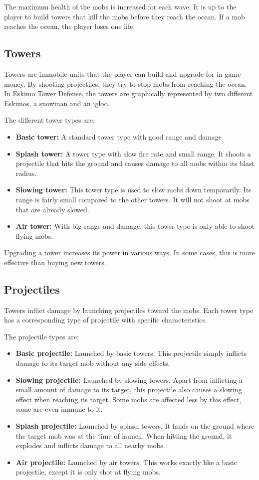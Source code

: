 The maximum health of the mobs is increased for each wave. It is up to the player to build towers that kill the mobs before they reach the ocean. If a mob reaches the ocean, the player loses one life.

\subsection{Towers}

Towers are immobile units that the player can build and upgrade for in-game money. By shooting projectiles, they try to stop mobs from reaching the ocean. In Eskimo Tower Defense, the towers are graphically represented by two different Eskimos, a snowman and an igloo. 

The different tower types are:
\begin{itemize}
\item {\bf Basic tower:} A standard tower type with good range and damage
\item {\bf Splash tower:} A tower type with slow fire rate and small range. It shoots a projectile that hits the ground and causes damage to all mobs within its blast radius.
\item {\bf Slowing tower:} This tower type is used to slow mobs down temporarily. Its range is fairly small compared to the other towers. It will not shoot at mobs that are already slowed.
\item {\bf Air tower:} With big range and damage, this tower type is only able to shoot flying mobs.
\end{itemize}

Upgrading a tower increases its power in various ways. In some cases, this is more effective than buying new towers. 

\subsection{Projectiles}

Towers inflict damage by launching projectiles toward the mobs. Each tower type has a corresponding type of projectile with specific characteristics. 

The projectile types are:
\begin{itemize}
\item {\bf Basic projectile:} Launched by basic towers. This projectile simply inflicts damage to its target mob without any side effects.
\item {\bf Slowing projectile:} Launched by slowing towers. Apart from inflicting a small amount of damage to its target, this projectile also causes a slowing effect when reaching its target. Some mobs are affected less by this effect, some are even immune to it.
\item {\bf Splash projectile:} Launched by splash towers. It lands on the ground where the target mob was at the time of launch. When hitting the ground, it explodes and inflicts damage to all nearby mobs. 
\item {\bf Air projectile:} Launched by air towers. This works exactly like a basic projectile, except it is only shot at flying mobs.
\end{itemize}

